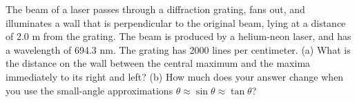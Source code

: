 \answercheck The beam of a laser passes through a diffraction
grating, fans out, and illuminates a wall that is perpendicular
to the original beam, lying at a distance of 2.0 m from
the grating. The beam is produced by a helium-neon laser,
and has a wavelength of 694.3 nm. The grating has 2000 lines
per centimeter. (a) What is the distance on the wall between
the central maximum and the maxima immediately to its right
and left? (b) How much does your answer change when you
use the small-angle approximations $\theta\approx\sin\theta\approx\tan\theta$?
